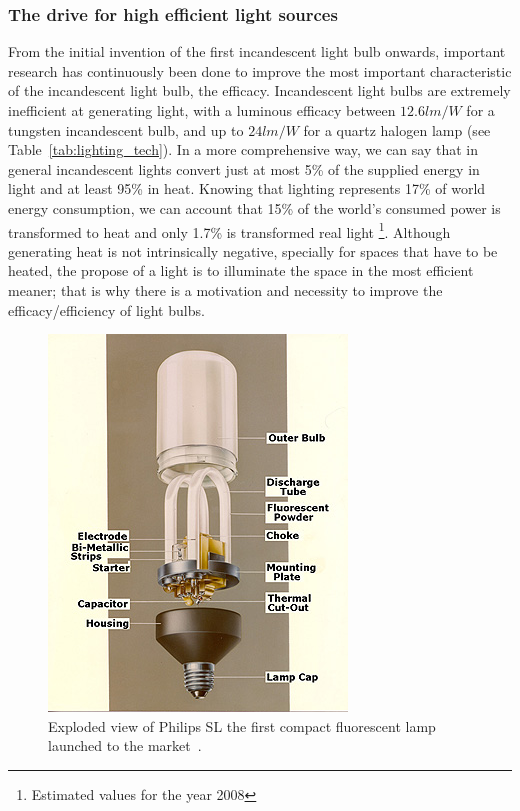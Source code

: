 \subsubsection{The drive for high efficient light sources}
From the initial invention of the first incandescent light bulb onwards, important research has continuously been done to improve the most important characteristic of the incandescent light bulb, the efficacy. Incandescent light bulbs are extremely inefficient at generating light, with a luminous efficacy between $12.6 lm/W$ for a tungsten incandescent bulb, and  up to $24 lm/W$ for a quartz halogen lamp (see Table~\ref{tab:lighting_tech}). In a more comprehensive way, we can say that in general incandescent lights convert just at most 5\% of the supplied energy in light and at least 95\% in heat. Knowing that lighting represents 17\% of world energy consumption, we can account that 15\% of the world's consumed power is transformed to heat and only 1.7\% is transformed real light \footnote{Estimated values for the year 2008}. Although generating heat is not intrinsically negative, specially for spaces that have to be heated, the propose of a light is to illuminate the space in the most efficient meaner; that is why there is a motivation and necessity to improve the efficacy/efficiency of light bulbs.

\begin{figure}
\centering
\includegraphics{./0_intro/img/phil1b.jpg}
\caption[Compact fluorescent lamp]{Exploded view of Philips SL the first compact fluorescent lamp launched to the market~\cite{lib:Philips}.}
\label{fig:philips_sl}
\end{figure}

